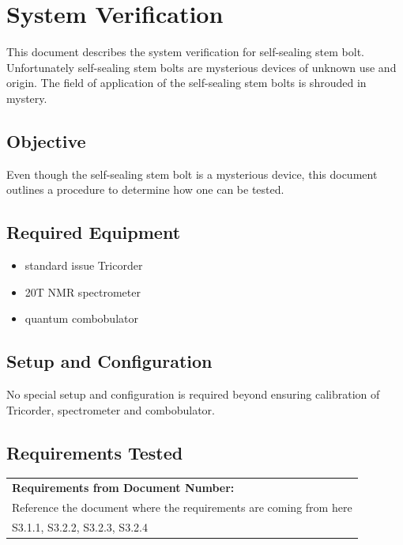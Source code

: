 \documentclass[a4paper,12pt]{article}
\theoremstyle{definition}
\def\arraystretch{1.5}%
\begin{document}
\section{System Verification}
This document describes the system verification for self-sealing stem bolt. Unfortunately self-sealing stem bolts are mysterious devices of unknown use and origin. The field of application of the self-sealing stem bolts is shrouded in mystery.

\subsection{Objective}

Even though the self-sealing stem bolt is a mysterious device, this document outlines a procedure to determine how one can be tested.

\subsection{Required Equipment}

\begin{itemize}
	\item standard issue Tricorder
	\item 20T NMR spectrometer
	\item quantum combobulator
\end{itemize}



\subsection{Setup and Configuration}

No special setup and configuration is required beyond ensuring calibration of Tricorder, spectrometer and combobulator.

\subsection{Requirements Tested}


\bgroup
\def\arraystretch{1.5}%
\begin{tabularx}{\textwidth}{|X|}
	\hline
	\textbf{Requirements from Document Number:} \\ Reference the document where the requirements are coming from here \\ \hline
	S3.1.1, S3.2.2, S3.2.3, S3.2.4              \\ \hline
\end{tabularx}
\egroup
\end{document}
